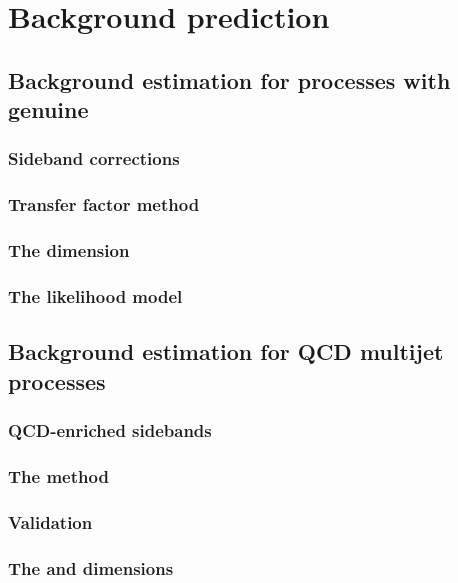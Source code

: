 \chapter{Background prediction}
\label{chap:backgroundPred}

\section{Background estimation for processes with genuine \MET}

\subsection{Sideband corrections}

\subsection{Transfer factor method}

\subsection{The \MHT dimension}

\subsection{The likelihood model}

\section{Background estimation for QCD multijet processes}

\subsection{QCD-enriched sidebands}

\subsection{The method}

\subsection{Validation}

\subsection{The \MHT and \nB dimensions}



